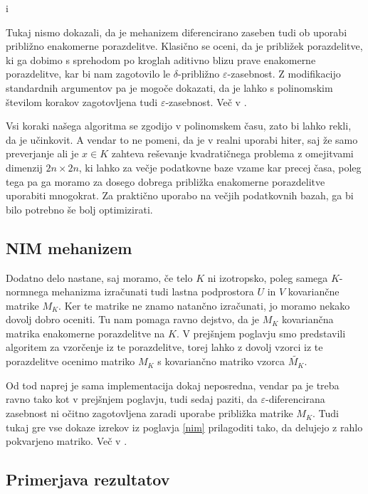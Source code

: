 i\documentclass[mat1]{fmfdelo}
\begin{document}
\begin{opomba}
    Tukaj nismo dokazali, da je mehanizem diferencirano zaseben tudi ob uporabi približno enakomerne porazdelitve. Klasično se oceni, da je približek porazdelitve, ki ga dobimo s sprehodom po kroglah aditivno blizu prave enakomerne porazdelitve, kar bi nam zagotovilo  le $\delta$-približno $\varepsilon$-zasebnost. Z modifikacijo standardnih argumentov pa je mogoče dokazati, da je lahko s polinomskim številom korakov zagotovljena tudi $\varepsilon$-zasebnost. Več v \cite{on-geometry}.
\end{opomba}

\begin{opomba}
    Vsi koraki našega algoritma se zgodijo v polinomskem času, zato bi lahko rekli, da je učinkovit. A vendar to ne pomeni, da je v realni uporabi hiter, saj že samo preverjanje ali je $x \in K$ zahteva reševanje kvadratičnega problema z omejitvami dimenzij $2n \times 2n$, ki lahko za večje podatkovne baze vzame kar precej časa, poleg tega pa ga moramo za dosego dobrega približka enakomerne porazdelitve uporabiti mnogokrat. Za praktično uporabo na večjih podatkovnih bazah, ga bi bilo potrebno še bolj optimizirati.
\end{opomba}

\subsection{NIM mehanizem}

Dodatno delo nastane, saj moramo, če telo $K$ ni izotropsko, poleg samega $K$-normnega mehanizma izračunati tudi lastna podprostora $U$ in $V$ kovariančne matrike $M_K$. Ker te matrike ne znamo natančno izračunati, jo moramo nekako dovolj dobro oceniti. Tu nam pomaga ravno dejstvo, da je $M_K$ kovariančna matrika enakomerne porazdelitve na $K$. V prejšnjem poglavju smo predstavili algoritem za vzorčenje iz te porazdelitve, torej lahko z dovolj vzorci iz te porazdelitve ocenimo matriko $M_K$ s kovariančno matriko vzorca $\tilde{M_K}$. 

Od tod naprej je sama implementacija dokaj neposredna, vendar pa je treba ravno tako kot v prejšnjem poglavju, tudi sedaj paziti, da $\varepsilon$-diferencirana zasebnost ni očitno zagotovljena zaradi uporabe približka matrike $M_K$. Tudi tukaj gre vse dokaze izrekov iz poglavja \ref{nim} prilagoditi tako, da delujejo z rahlo pokvarjeno matriko. Več v \cite{on-geometry}.

\subsection{Primerjava rezultatov}
\end{document}
